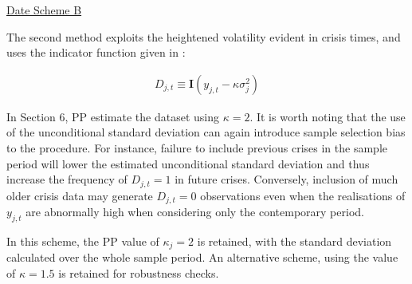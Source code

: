 \documentclass[../base.tex]{subfiles}
\begin{document}
\underline{Date Scheme B}

The second method exploits the heightened volatility evident in crisis times, and uses the indicator function given in \cite{pesaran2007econometric}:

\begin{align}
	D_{j, t} \equiv \mathbf{I}(y_{j,t} - \kappa \sigma^2_{j})
\end{align}

In Section 6, PP estimate the \cite{eichengreen1996contagious} dataset using $\kappa = 2$. It is worth noting that the use of the unconditional standard deviation can again introduce sample selection bias to the procedure. For instance, failure to include previous crises in the sample period will lower the estimated unconditional standard deviation and thus increase the frequency of $D_{j,t} = 1$ in future crises. Conversely, inclusion of much older crisis data may generate $D_{j,t} = 0$ observations even when the realisations of $y_{j,t}$ are abnormally high when considering only the contemporary period. 

In this scheme, the PP value of $\kappa_j = 2$ is retained, with the standard deviation calculated over the whole sample period. An alternative scheme, using the \cite{eichengreen1996contagious} value of $\kappa = 1.5$ is retained for robustness checks.
\end{document}
